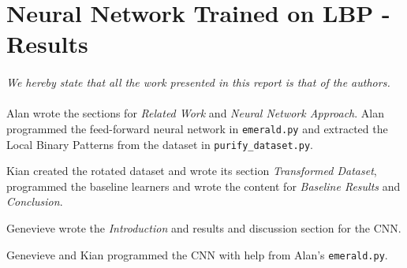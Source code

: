 \section{Neural Network Trained on LBP - Results} \label{appendix:images}




\newpage
\begin{multicols}{2}
\paragraph*{} \lettrine[nindent=0em,lines=1]{\textit{W}}{}\textit{e hereby state that all the work presented in this report is that of the authors. }
\paragraph*{} Alan wrote the sections for \emph{Related Work} and \emph{Neural Network Approach}. Alan programmed the feed-forward neural network in \texttt{emerald.py} and extracted the Local Binary Patterns from the dataset in \texttt{purify\_dataset.py}. 
\par Kian created the rotated dataset and wrote its section \emph{Transformed Dataset}, programmed the baseline learners and wrote the content for \emph{Baseline Results} and \emph{Conclusion}. 
\par Genevieve wrote the \emph{Introduction} and results and discussion section for the CNN.
\par Genevieve and Kian programmed the CNN with help from Alan's \texttt{emerald.py}. 


\end{multicols}

